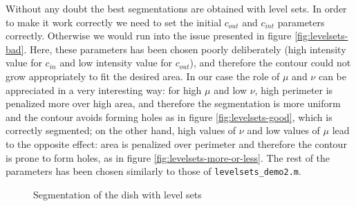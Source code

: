 Without any doubt the best segmentations are obtained with level sets. In order to make it work correctly we need to set the initial $ c_{out} $ and $ c_{int} $ parameters correctly. Otherwise we would run into the issue presented in figure \ref{fig:levelsets-bad}. Here, these parameters has been chosen poorly deliberately (high intensity value for $ c_{in} $ and low intensity value for $ c_{out} $), and therefore the contour could not grow appropriately to fit the desired area. In our case the role of $\mu$ and $\nu$ can be appreciated in a very interesting way: for high $\mu$ and low $\nu$, high perimeter is penalized more over high area, and therefore the segmentation is more uniform and the contour avoids forming holes as in figure \ref{fig:levelsets-good}, which is correctly segmented; on the other hand, high values of $\nu$ and low values of $\mu$ lead to the opposite effect: area is penalized over perimeter and therefore the contour is prone to form holes, as in figure \ref{fig:levelsets-more-or-less}. The rest of the parameters has been chosen similarly to those of \texttt{levelsets\_demo2.m}.

\begin{figure}[!hbt]
\centering   
{}


\caption{Segmentation of the dish with level sets}
\label{fig:levelsets-dish}
\end{figure}
